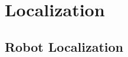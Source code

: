 \documentclass[letterpaper,10pt,english]{sphinxmanual}
\begin{document}
\sphinxstepscope


\section{Localization}
\label{\detokenize{Localization_index:localization}}\label{\detokenize{Localization_index::doc}}
\sphinxstepscope


\subsection{Robot Localization}
\label{\detokenize{Localization:robot-localization}}\label{\detokenize{Localization::doc}}
\begin{figure}[htbp]
\centering

\noindent{}
\end{figure}
\end{document}
